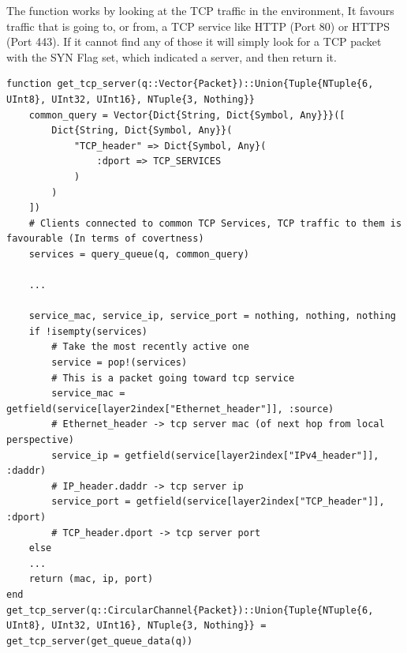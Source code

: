 The  function works by looking at the TCP traffic in the environment, It favours traffic that is going to, or from, a TCP service like HTTP (Port 80) or HTTPS (Port 443). If it cannot find any of those it will simply look for a TCP packet with the SYN Flag set, which indicated a server, and then return it.

\begin{lstlisting}[language=JuliaLocal, style=julia]
function get_tcp_server(q::Vector{Packet})::Union{Tuple{NTuple{6, UInt8}, UInt32, UInt16}, NTuple{3, Nothing}}
    common_query = Vector{Dict{String, Dict{Symbol, Any}}}([
        Dict{String, Dict{Symbol, Any}}(
            "TCP_header" => Dict{Symbol, Any}(
                :dport => TCP_SERVICES
            )
        )
    ])
    # Clients connected to common TCP Services, TCP traffic to them is favourable (In terms of covertness)
    services = query_queue(q, common_query)
    
    ...

    service_mac, service_ip, service_port = nothing, nothing, nothing
    if !isempty(services)
        # Take the most recently active one
        service = pop!(services)
        # This is a packet going toward tcp service
        service_mac = getfield(service[layer2index["Ethernet_header"]], :source)
        # Ethernet_header -> tcp server mac (of next hop from local perspective)
        service_ip = getfield(service[layer2index["IPv4_header"]], :daddr)
        # IP_header.daddr -> tcp server ip
        service_port = getfield(service[layer2index["TCP_header"]], :dport)
        # TCP_header.dport -> tcp server port
    else
    ...
    return (mac, ip, port)
end
get_tcp_server(q::CircularChannel{Packet})::Union{Tuple{NTuple{6, UInt8}, UInt32, UInt16}, NTuple{3, Nothing}} = get_tcp_server(get_queue_data(q))
\end{lstlisting}

